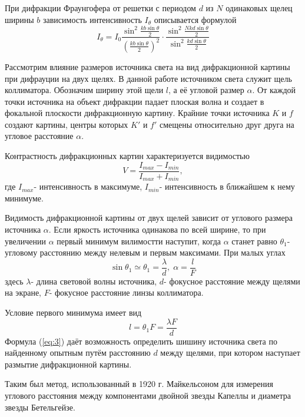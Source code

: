 При дифракции Фраунгофера от решетки с периодом $d$ из $N$ одинаковых щелец ширины $b$ зависимость интенсивность $I_{\theta}$ описывается формулой
\begin{equation}
	I_{\theta}=I_0\frac{\sin^2\frac{kb\sin\theta}{2}}{(\frac{kb\sin\theta}{2})^2}
	\cdot
	\frac{\sin^2\frac{Nkd\sin{\theta}}{2}}{\sin^2\frac{kd\sin{\theta}}{2}}	
\end{equation}

Рассмотрим влияние размеров источника света на вид дифракционной картины при дифрауции на двух щелях. В данной работе источником света служит щель коллиматора. Обозначим ширину этой щели $l$, а её угловой размер $\alpha$. %
От каждой точки источника на объект дифракции падает плоская волна и создает в фокальной плоскости дифракционную картину. Крайние точки источника $K$ и $f$ создают картины, центры которых $K'$ и $f'$ смещены относительно друг друга на угловое расстояние $\alpha$. %

Контрастность дифракционных картин характеризуется видимостью
\begin{equation}
	V=\frac{I_{max}-I_{min}}{I_{max}+I_{min}},
\end{equation}
где $I_{max}$- интенсивность в максимуме, $I_{min}$- интенсивность в ближайшем к нему минимуме.

Видимость дифракционной картины от двух щелей зависит от углового размера источника $\alpha$. Если яркость источника одинакова по всей ширине, то при увеличении $\alpha$ первый минимум вилимостти наступит, когда $\alpha$ станет равно $\theta_1$- угловому расстоянию между нелевым и первым максимами. При малых углах
\begin{equation}
	\sin{\theta_1}\simeq\theta_1=\frac{\lambda}{d},\; \alpha=\frac{l}{F}
\end{equation}
здесь $\lambda$- длина световой волны источника, $d$- фокусное расстояние между щелями на экране, $F$- фокусное расстояние линзы коллиматора.

Условие первого минимума имеет вид
\begin{equation}
	\label{eq:3}
	l=\theta_1F=\frac{\lambda F}{d}
\end{equation}
Формула (\ref{eq:3}) даёт возможность определить шишину источника света по найденному опытным путём расстоянию $d$ между щелями, при котором наступает размытие дифракционной картины.

Таким был метод, использованный в 1920 г. Майкельсоном для измерения углового расстояния между компонентами двойной звезды Капеллы и диаметра звезды Бетельгейзе.

